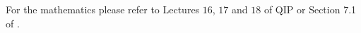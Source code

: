 For the mathematics please refer to Lectures $16$, $17$ and $18$ of QIP\cite{QIPLect} or Section 7.1 of \cite{2000:IQC:367701.367709}.

% 
% 
